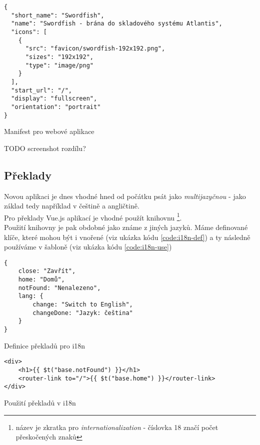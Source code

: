 \begin{listing}[H]
\begin{verbatim}
{
  "short_name": "Swordfish",
  "name": "Swordfish - brána do skladového systému Atlantis",
  "icons": [
    {
      "src": "favicon/swordfish-192x192.png",
      "sizes": "192x192",
      "type": "image/png"
    }
  ],
  "start_url": "/",
  "display": "fullscreen",
  "orientation": "portrait"
}
\end{verbatim}
\caption{Manifest pro webové aplikace} \label{code:webapp-manifest}
\end{listing}

TODO screenshot rozdílu?


\subsection{Překlady}

Novou aplikaci je dnes vhodné hned od počátku psát jako \emph{multijazyčnou} - jako základ tedy například v češtině a angličtině.\\
Pro překlady Vue.js aplikací je vhodné použít knihovnu \footnote{název je zkratka pro \emph{internationalization} - číslovka 18 značí počet přeskočených znaků}. \cite{vue-i18n}\\
Použití knihovny je pak obdobné jako známe z jiných jazyků. Máme definované klíče, které mohou být i vnořené (viz ukázka kódu \ref{code:i18n-def}) a ty následně používáme v šabloně (viz ukázka kódu \ref{code:i18n-use})
\begin{listing}[h]
\begin{verbatim}
{
    close: "Zavřít",
    home: "Domů",
    notFound: "Nenalezeno",
    lang: {
        change: "Switch to English",
        changeDone: "Jazyk: čeština"
    }
}
\end{verbatim}
\caption{Definice překladů pro i18n} \label{code:i18n-def}
\end{listing}

\begin{listing}[h]
\begin{verbatim}
<div>
    <h1>{{ $t("base.notFound") }}</h1>
    <router-link to="/">{{ $t("base.home") }}</router-link>
</div>
\end{verbatim}
\caption{Použití překladů v i18n} \label{code:i18n-use}
\end{listing}

